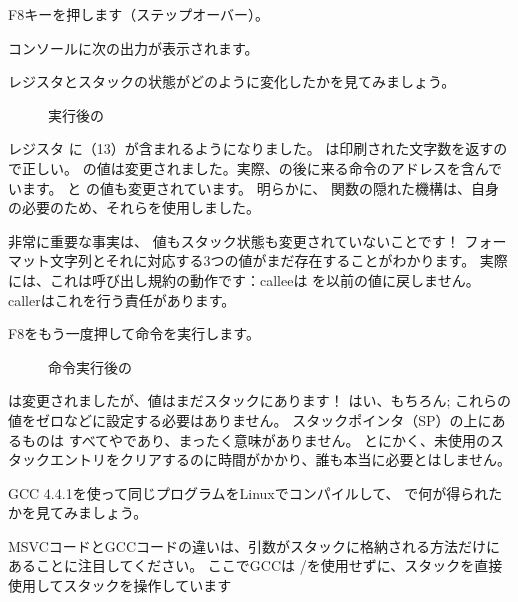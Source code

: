 \clearpage
F8キーを押します（ステップオーバー）。

コンソールに次の出力が表示されます。



レジスタとスタックの状態がどのように変化したかを見てみましょう。

\begin{figure}[H]
\centering
{}
\caption{\printf{} 実行後の \olly }
\label{fig:printf3_olly_3}
\end{figure}

レジスタ \EAX に（13）が含まれるようになりました。 
\printf は印刷された文字数を返すので正しい。 
\EIP の値は変更されました。実際、の後に来る命令のアドレスを含んでいます。 
\ECX と \EDX の値も変更されています。 
明らかに、 \printf 関数の隠れた機構は、自身の必要のため、それらを使用しました。

非常に重要な事実は、 \ESP 値もスタック状態も変更されていないことです！
フォーマット文字列とそれに対応する3つの値がまだ存在することがわかります。
実際には、これは呼び出し規約の動作です：\gls{callee}は \ESP を以前の値に戻しません。 
\gls{caller}はこれを行う責任があります。

\clearpage
F8をもう一度押して命令を実行します。

\begin{figure}[H]
\centering
{}
\caption{命令実行後の \olly }
\label{fig:printf3_olly_4}
\end{figure}

\ESP は変更されましたが、値はまだスタックにあります！ 
はい、もちろん; これらの値をゼロなどに設定する必要はありません。 
スタックポインタ（\ac{SP}）の上にあるものは
すべてや\IT{\garbage{}}であり、まったく意味がありません。
とにかく、未使用のスタックエントリをクリアするのに時間がかかり、誰も本当に必要とはしません。

GCC 4.4.1を使って同じプログラムをLinuxでコンパイルして、 \IDA で何が得られたかを見てみましょう。



MSVCコードとGCCコードの違いは、引数がスタックに格納される方法だけにあることに注目してください。 
ここでGCCは \PUSH/\POP を使用せずに、スタックを直接使用してスタックを操作しています


